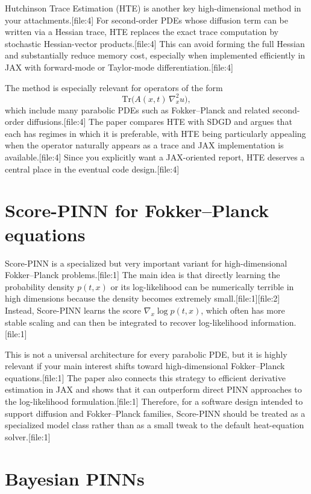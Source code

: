 \documentclass[11pt]{report}
\begin{document}
Hutchinson Trace Estimation (HTE) is another key high-dimensional method in your attachments.[file:4]  
For second-order PDEs whose diffusion term can be written via a Hessian trace, HTE replaces the exact trace computation by stochastic Hessian-vector products.[file:4]  
This can avoid forming the full Hessian and substantially reduce memory cost, especially when implemented efficiently in JAX with forward-mode or Taylor-mode differentiation.[file:4]

The method is especially relevant for operators of the form
\[
\mathrm{Tr}\!\bigl(A(x,t)\,\nabla_x^2 u\bigr),
\]
which include many parabolic PDEs such as Fokker--Planck and related second-order diffusions.[file:4]  
The paper compares HTE with SDGD and argues that each has regimes in which it is preferable, with HTE being particularly appealing when the operator naturally appears as a trace and JAX implementation is available.[file:4]  
Since you explicitly want a JAX-oriented report, HTE deserves a central place in the eventual code design.[file:4]

\section{Score-PINN for Fokker--Planck equations}

Score-PINN is a specialized but very important variant for high-dimensional Fokker--Planck problems.[file:1]  
The main idea is that directly learning the probability density \(p(t,x)\) or its log-likelihood can be numerically terrible in high dimensions because the density becomes extremely small.[file:1][file:2]  
Instead, Score-PINN learns the score \(\nabla_x \log p(t,x)\), which often has more stable scaling and can then be integrated to recover log-likelihood information.[file:1]

This is not a universal architecture for every parabolic PDE, but it is highly relevant if your main interest shifts toward high-dimensional Fokker--Planck equations.[file:1]  
The paper also connects this strategy to efficient derivative estimation in JAX and shows that it can outperform direct PINN approaches to the log-likelihood formulation.[file:1]  
Therefore, for a software design intended to support diffusion and Fokker--Planck families, Score-PINN should be treated as a specialized model class rather than as a small tweak to the default heat-equation solver.[file:1]

\section{Bayesian PINNs}
\end{document}
